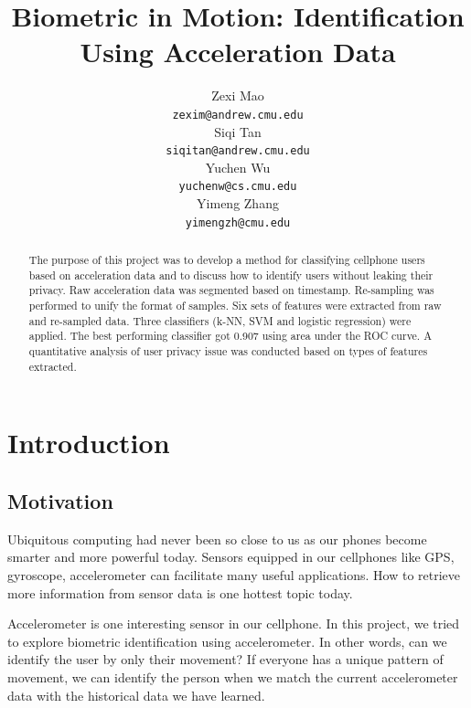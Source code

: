 \documentclass{article} %
\title{Biometric in Motion: Identification Using Acceleration Data}
\author{
Zexi Mao\\
\texttt{zexim@andrew.cmu.edu} \\
\And
Siqi Tan \\
\texttt{siqitan@andrew.cmu.edu} \\
\AND
Yuchen Wu\\
\texttt{yuchenw@cs.cmu.edu} \\
\And
Yimeng Zhang \\
\texttt{yimengzh@cmu.edu} \\
}
\begin{document}
\maketitle

\begin{abstract}
The purpose of this project was to develop a method for classifying cellphone users based on acceleration data and to discuss how to identify users without leaking their privacy. Raw acceleration data was segmented based on timestamp. Re-sampling was performed to unify the format of samples. Six sets of features were extracted from raw and re-sampled data. Three classifiers (k-NN, SVM and logistic regression) were applied. The best performing classifier got 0.907 using area under the ROC curve. A quantitative analysis of user privacy issue was conducted based on types of features extracted.
\end{abstract}

\section{Introduction}

\subsection{Motivation}

Ubiquitous computing had never been so close to us as our phones become smarter and more powerful today. Sensors equipped in our cellphones like GPS, gyroscope, accelerometer can facilitate many useful applications. How to retrieve more information from sensor data is one hottest topic today.

Accelerometer is one interesting sensor in our cellphone. In this project, we tried to explore biometric identification using accelerometer. In other words, can we identify the user by only their movement? If everyone has a unique pattern of movement, we can identify the person when we match the current accelerometer data with the historical data we have learned. 
\end{document}
